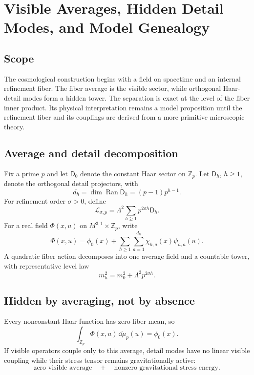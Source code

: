 \chapter{Visible Averages, Hidden Detail Modes, and Model Genealogy}


\label{ch:hidden-detail-sector}
\section{Scope}
The cosmological construction begins with a field on spacetime and an internal refinement fiber. The fiber average is the visible sector, while orthogonal Haar-detail modes form a hidden tower. The separation is exact at the level of the fiber inner product. Its physical interpretation remains a model proposition until the refinement fiber and its couplings are derived from a more primitive microscopic theory.
\section{Average and detail decomposition}
Fix a prime $p$ and let $\mathsf D_0$ denote the constant Haar sector on $\mathbb Z_p$. Let $\mathsf D_h$, $h\ge1$, denote the orthogonal detail projectors, with
\begin{equation}d_h=\dim\operatorname{Ran}\mathsf D_h=(p-1)p^{h-1}.\end{equation}
For refinement order $\sigma>0$, define
\begin{equation}\mathcal L_{\sigma,p}=\Lambda^2\sum_{h\ge1}p^{2\sigma h}\mathsf D_h.\end{equation}
For a real field $\Phi(x,u)$ on $M^{3,1}\times\mathbb Z_p$, write
\begin{equation}\Phi(x,u)=\phi_0(x)+\sum_{h\ge1}\sum_{a=1}^{d_h}\chi_{h,a}(x)\psi_{h,a}(u).\end{equation}
A quadratic fiber action decomposes into one average field and a countable tower, with representative level law
\begin{equation}m_h^2=m_0^2+\Lambda^2p^{2\sigma h}.\end{equation}
\section{Hidden by averaging, not by absence}
Every nonconstant Haar function has zero fiber mean, so
\begin{equation}\int_{\mathbb Z_p}\Phi(x,u)\,\dd\mu_p(u)=\phi_0(x).\end{equation}
If visible operators couple only to this average, detail modes have no linear visible coupling while their stress tensor remains gravitationally active:
\begin{equation}\boxed{\text{zero visible average}\quad+\quad\text{nonzero gravitational stress energy}.}\end{equation}
